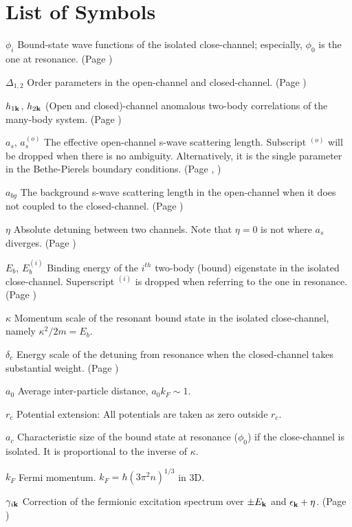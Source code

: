 \documentclass[edeposit,fullpage,prequest,10pt]{uiucthesis2009}
\begin{document}
\chapter{List of Symbols}

\begin{symbollist}[0.7in]
\item[$\phi_{i}$] Bound-state wave functions of the isolated close-channel; especially, $\phi_{0}$ is the one at resonance. (Page \pageref{eq:pathInt2:phi})
\item[$\Delta_{1,2}$] Order parameters in the open-channel and closed-channel. (Page \pageref{eq:pathInt2:identity})
\item[$h_{1\mathbf{k}}$, $ h_{2\mathbf{k}}$] (Open and closed)-channel anomalous two-body correlations of the many-body system. (Page \pageref{eq:pathInt2:h2})
\item[$a_{s}$, $a_{s}^{(o)}$] The effective open-channel s-wave scattering length. Subscript ${}^{(o)}$ will be dropped when there is no ambiguity. Alternatively, it is  the single parameter in  the Bethe-Pierels boundary conditions. (Page \pageref{sec:intro:as}, \pageref{eq:intro:asK})
\item[$a_{bg}$] The background s-wave scattering length in the open-channel when it does not coupled to the closed-channel. (Page \pageref{eq:intro:abg})
\item[$\eta$] Absolute detuning between two channels. Note that $\eta=0$ is not where $a_{s}$ diverges. (Page \pageref{eq:intro:ham})
\item[$E_{b}$, $E_{b}^{(i)}$] Binding energy of the $i^{th}$ two-body (bound) eigenstate in the isolated close-channel.  Superscript ${}^{(i)}$ is dropped when referring to the one in resonance. (Page \pageref{eq:intro:sch2})
\item[$\kappa$] Momentum scale of the resonant bound state in the isolated close-channel, namely  $\kappa^{2}/2m=E_{b}$.
\item[$\delta_{c}$] Energy scale of the  detuning from resonance when the closed-channel takes substantial weight. (Page \pageref{eq:intro:deltaC})
\item[$a_{0}$] Average inter-particle distance, $a_{0}k_{F}\sim1$.
\item[$r_{c}$] Potential extension:  All  potentials are taken as zero outside $r_{c}$.
\item[$a_{c}$] Characteristic size of the bound state at resonance ($\phi_{0}$) if the close-channel is isolated. It is proportional  to the inverse of $\kappa$.
\item[$k_{F}$] Fermi momentum. $k_{F}=\hbar(3\pi^{2}n)^{1/3}$ in 3D.
\item[$\gamma_{i\mathbf{k}}$] Correction of the fermionic excitation spectrum over $\pm{}E_{\mathbf{k}}$ and $\epsilon_{\mathbf{k}}+\eta$. (Page \pageref{eq:pathInt2:xiExpand})


\end{symbollist}
\end{document}
